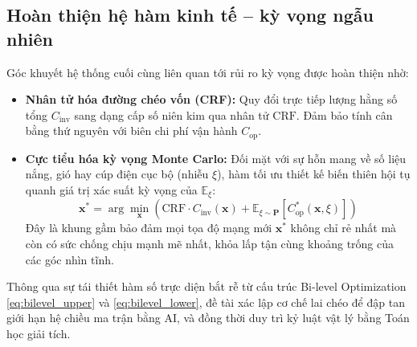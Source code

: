 \subsection{Hoàn thiện hệ hàm kinh tế -- kỳ vọng ngẫu nhiên}
Góc khuyết hệ thống cuối cùng liên quan tới rủi ro kỳ vọng được hoàn thiện nhờ:
\begin{itemize}
    \item \textbf{Nhân tử hóa đường chéo vốn (CRF):} Quy đổi trực tiếp lượng hằng số tổng $C_{\mathrm{inv}}$ sang dạng cấp số niên kim qua nhân tử $\mathrm{CRF}$. Đảm bảo tính cân bằng thứ nguyên với biên chi phí vận hành $C_{\mathrm{op}}$.
    \item \textbf{Cực tiểu hóa kỳ vọng Monte Carlo:} Đối mặt với sự hỗn mang về số liệu nắng, gió hay cúp điện cục bộ (nhiễu $\xi$), hàm tối ưu thiết kế biến thiên hội tụ quanh giá trị xác suất kỳ vọng của $\mathbb{E}_{\xi}$:
    \begin{equation*}
        \mathbf{x}^* = \arg\min_{\mathbf{x}} \left( \mathrm{CRF} \cdot C_{\mathrm{inv}}(\mathbf{x}) + \mathbb{E}_{\xi \sim \mathbf{P}} \left[ C_{\mathrm{op}}^*(\mathbf{x}, \xi) \right] \right)
    \end{equation*}
    Đây là khung gầm bảo đảm mọi tọa độ mạng mới $\mathbf{x}^*$ không chỉ rẻ nhất mà còn có sức chống chịu mạnh mẽ nhất, khỏa lấp tận cùng khoảng trống của các góc nhìn tĩnh.
\end{itemize}

Thông qua sự tái thiết hàm số trực diện bắt rễ từ cấu trúc Bi-level Optimization \eqref{eq:bilevel_upper} và \eqref{eq:bilevel_lower}, đề tài xác lập cơ chế lai chéo để đập tan giới hạn hệ chiều ma trận bằng AI, và đồng thời duy trì kỷ luật vật lý bằng Toán học giải tích.
